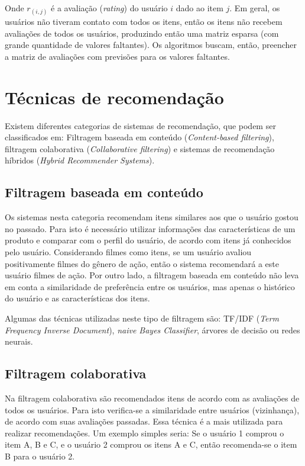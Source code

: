 \documentclass[12pt,a4paper,header]{abnt}
\begin{document}
Onde $r_{(i, j)}$ é a avaliação (\textit{rating}) do usuário $i$ dado ao item $j$. Em geral, os usuários não tiveram contato com todos os itens, então os itens não recebem avaliações de todos os usuários, produzindo então uma matriz esparsa (com grande quantidade de valores faltantes). Os algoritmos buscam, então, preencher a matriz de avaliações com previsões para os valores faltantes.

\section{Técnicas de recomendação}

Existem diferentes categorias de sistemas de recomendação, que podem ser classificados em: Filtragem baseada em conteúdo (\textit{Content-based filtering}), filtragem colaborativa (\textit{Collaborative filtering}) e sistemas de recomendação híbridos (\textit{Hybrid Recommender Systems})\cite{melville2011recommender}.

\subsection{Filtragem baseada em conteúdo}

Os sistemas nesta categoria recomendam itens similares aos que o usuário gostou no passado\cite{gorakala2015building}. Para isto é necessário utilizar informações das características de um produto\cite{shapira2011recommender} e comparar com o perfil do usuário, de acordo com itens já conhecidos pelo usuário. Considerando filmes como itens, se um usuário avaliou positivamente filmes do gênero de ação, então o sistema recomendará a este usuário filmes de ação. Por outro lado, a filtragem baseada em conteúdo não leva em conta a similaridade de preferência entre os usuários, mas apenas o histórico do usuário e as características dos itens\cite{gorakala2015building}.

Algumas das técnicas utilizadas neste tipo de filtragem são: TF/IDF (\textit{Term Frequency Inverse Document}), \textit{naive Bayes Classifier}, árvores de decisão ou redes neurais\cite{isinkaye2015recommendation}. 

\subsection{Filtragem colaborativa}

Na filtragem colaborativa são recomendados itens de acordo com as avaliações de todos os usuários\cite{melville2011recommender}. Para isto verifica-se a similaridade entre usuários (vizinhança), de acordo com suas avaliações passadas. Essa técnica é a mais utilizada para realizar recomendações\cite{shapira2011recommender}. Um exemplo simples seria: Se o usuário 1 comprou o item A, B e C, e o usuário 2 comprou os itens A e C, então recomenda-se o item B para o usuário 2.
\end{document}
